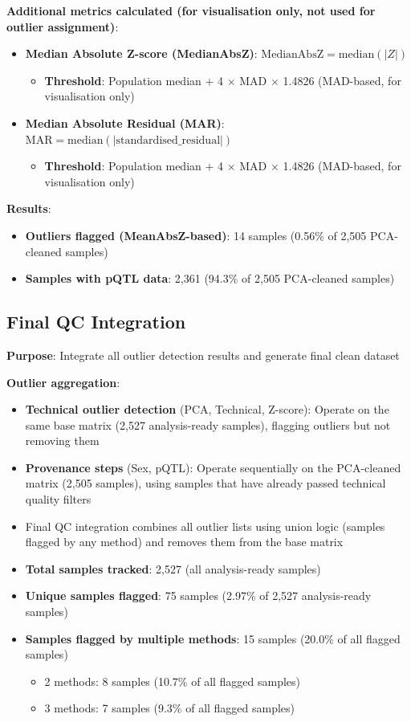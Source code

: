 \documentclass[11pt,a4paper]{article}
\begin{document}
\textbf{Additional metrics calculated (for visualisation only, not used for outlier assignment)}:
\begin{itemize}
\item \textbf{Median Absolute Z-score (MedianAbsZ)}: $\text{MedianAbsZ} = \text{median}(|Z|)$
  \begin{itemize}
    \item \textbf{Threshold}: Population median $+$ 4 $\times$ MAD $\times$ 1.4826 (MAD-based, for visualisation only)
  \end{itemize}
\item \textbf{Median Absolute Residual (MAR)}: $\text{MAR} = \text{median}(|\text{standardised\_residual}|)$
  \begin{itemize}
    \item \textbf{Threshold}: Population median $+$ 4 $\times$ MAD $\times$ 1.4826 (MAD-based, for visualisation only)
  \end{itemize}
\end{itemize}

\textbf{Results}:
\begin{itemize}
\item \textbf{Outliers flagged (MeanAbsZ-based)}: 14 samples (0.56\% of 2,505 PCA-cleaned samples)
\item \textbf{Samples with pQTL data}: 2,361 (94.3\% of 2,505 PCA-cleaned samples)
\end{itemize}

\subsection{Final QC Integration}
\textbf{Purpose}: Integrate all outlier detection results and generate final clean dataset

\textbf{Outlier aggregation}:
\begin{itemize}
\item \textbf{Technical outlier detection} (PCA, Technical, Z-score): Operate on the same base matrix (2,527 analysis-ready samples), flagging outliers but not removing them
\item \textbf{Provenance steps} (Sex, pQTL): Operate sequentially on the PCA-cleaned matrix (2,505 samples), using samples that have already passed technical quality filters
\item Final QC integration combines all outlier lists using union logic (samples flagged by any method) and removes them from the base matrix
\item \textbf{Total samples tracked}: 2,527 (all analysis-ready samples)
\item \textbf{Unique samples flagged}: 75 samples (2.97\% of 2,527 analysis-ready samples)
\item \textbf{Samples flagged by multiple methods}: 15 samples (20.0\% of all flagged samples)
  \begin{itemize}
    \item 2 methods: 8 samples (10.7\% of all flagged samples)
    \item 3 methods: 7 samples (9.3\% of all flagged samples)
  \end{itemize}
\end{itemize}
\end{document}
